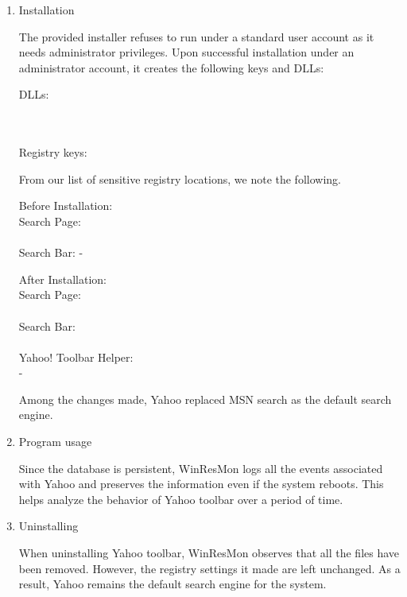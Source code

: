 \begin{enumerate}
\item Installation

The provided installer refuses to run under a standard user account as it
needs administrator privileges. Upon successful installation under an
administrator account, it creates the following keys and DLLs:

\noindent DLLs:\\
\\
\\

\noindent Registry keys:\\

 From our list of sensitive registry locations, we note the following.

\noindent Before Installation: \\
Search Page: \\
 \\
Search Bar:  -

\noindent After Installation: \\
Search Page: \\
 \\
Search Bar: \\
 \\
Yahoo! Toolbar Helper: \\
 -

Among the changes made, Yahoo replaced MSN search as the default search
engine.

\item Program usage

Since the database is persistent, WinResMon logs all the events associated with
Yahoo and preserves the information even if the system reboots.  This helps
analyze the behavior of Yahoo toolbar over a period of time.

\item Uninstalling

When uninstalling Yahoo toolbar, WinResMon observes that all the files have been
removed.  However, the registry settings it made are left unchanged. As a
result, Yahoo remains the default search engine for the system.

\end{enumerate}


